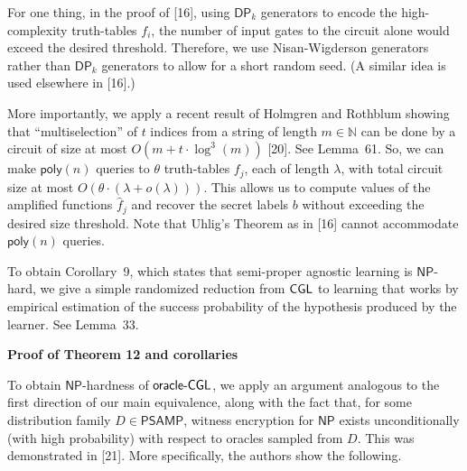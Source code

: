 \documentclass[10pt,a4paper]{article}
\begin{document}
For one thing, in the proof of [16], using ${\mathsf{DP}}_{k}$ generators to encode the high-complexity truth-tables $f_{i}$, the number of input gates to the circuit alone would exceed the desired threshold. Therefore, we use Nisan-Wigderson generators rather than ${\mathsf{DP}}_{k}$ generators to allow for a short random seed. (A similar idea is used elsewhere in [16].)\par




More importantly, we apply a recent result of Holmgren and Rothblum showing that “multiselection” of $t$ indices from a string of length $m\in\mathbb{N}$ can be done by a circuit of size at most $O(m+t\cdot\log^{3}(m))$ [20]. See Lemma 61. So, we can make ${\mathsf{poly}}(n)$ queries to $\theta$ truth-tables $f_{j}$, each of length $\lambda$, with total circuit size at most $O(\theta\cdot(\lambda+o(\lambda)))$. This allows us to compute values of the amplified functions $\hat{f}_{j}$ and recover the secret labels $b$ without exceeding the desired size threshold. Note that Uhlig’s Theorem as in [16] cannot accommodate ${\mathsf{poly}}(n)$ queries.\par




To obtain Corollary 9, which states that semi-proper agnostic learning is ${\mathsf{NP}}$-hard, we give a simple randomized reduction from ${\sf CGL}$ to learning that works by empirical estimation of the success probability of the hypothesis produced by the learner. See Lemma 33.\par





\par\medskip\noindent\textbf{Proof of Theorem 12 and corollaries}\par




To obtain ${\mathsf{NP}}$-hardness of ${\sf oracle}\text{-}{\sf CGL}$, we apply an argument analogous to the first direction of our main equivalence, along with the fact that, for some distribution family $D\in{\mathsf{P}}{\mathsf{SAMP}}$, witness encryption for ${\mathsf{NP}}$ exists unconditionally (with high probability) with respect to oracles sampled from $D$. This was demonstrated in [21]. More specifically, the authors show the following.\par



\end{document}
